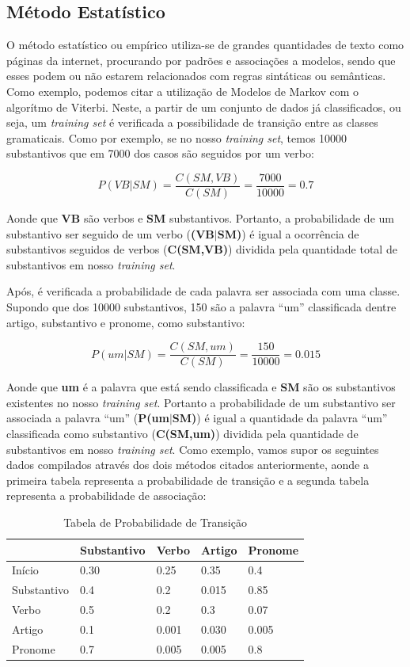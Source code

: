 \subsection{Método Estatístico} 
O método estatístico ou empírico utiliza-se de grandes
quantidades de texto como páginas da internet, procurando por padrões e
associações a modelos, sendo que esses podem ou não estarem relacionados com
regras sintáticas ou semânticas. Como exemplo, podemos citar a utilização de
Modelos de Markov com o algorítmo de Viterbi. Neste, a partir de um conjunto de
dados já classificados, ou seja, um \textit{training set} é verificada a
possibilidade de transição entre as classes gramaticais.
Como por exemplo, se no nosso \textit{training set}, temos 10000 substantivos que em 7000 dos casos são seguidos por um verbo:

\[ P(VB|SM) = \frac{C(SM,VB)}{C(SM)} = \frac{7000}{10000} = 0.7 \]

Aonde que \textbf{VB} são verbos e \textbf{SM} substantivos. Portanto, a
probabilidade de um substantivo ser seguido de um verbo
(\textbf{(VB$\vert$SM)}) é igual a ocorrência de substantivos seguidos de verbos (\textbf{C(SM,VB)})
dividida pela quantidade total de substantivos em nosso \textit{training set}.

Após, é verificada a probabilidade de cada palavra ser associada com uma classe.
Supondo que dos 10000 substantivos, 150 são a palavra ``um'' classificada
dentre artigo, substantivo e pronome, como substantivo:

\[ P(um|SM) = \frac{C(SM,um)}{C(SM)} = \frac{150}{10000} = 0.015 \]

Aonde que \textbf{um} é a palavra que está sendo classificada e \textbf{SM}
são os substantivos existentes no nosso \textit{training set}. Portanto a
probabilidade de um substantivo ser associada a palavra ``um''
(\textbf{P(um$\vert$SM)}) é igual a quantidade da palavra ``um''
classificada como substantivo (\textbf{C(SM,um)}) dividida pela quantidade de
substantivos em nosso \textit{training set}.
Como exemplo, vamos supor os seguintes dados compilados através dos dois métodos
citados anteriormente, aonde a primeira tabela representa a probabilidade de
transição e a segunda tabela representa a probabilidade de associação:

\begin{table}[htb]
\centering
\begin{tabular}{|l|l|l|l|l|}
\hline
            & Substantivo & Verbo & Artigo & Pronome \\ \hline
Início      & 0.30        & 0.25  & 0.35   & 0.4     \\ \hline
Substantivo & 0.4         & 0.2   & 0.015  & 0.85    \\ \hline
Verbo       & 0.5         & 0.2   & 0.3    & 0.07    \\ \hline
Artigo      & 0.1         & 0.001 & 0.030  & 0.005   \\ \hline
Pronome     & 0.7         & 0.005 & 0.005  & 0.8     \\ \hline
\end{tabular}
\caption{Tabela de Probabilidade de Transição}
\label{tabela:transicao}
\end{table} 

